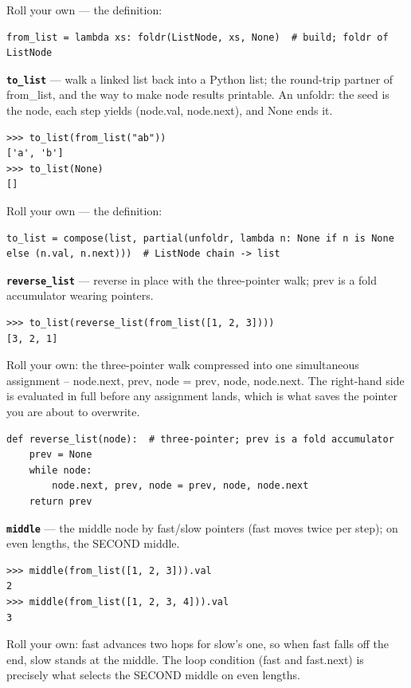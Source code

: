 \documentclass[10pt,letterpaper]{article}
\begin{document}
Roll your own --- the definition:

\begin{lstlisting}[style=ex]
from_list = lambda xs: foldr(ListNode, xs, None)  # build; foldr of ListNode
\end{lstlisting}
\textbf{\texttt{to\_list}} --- walk a linked list back into a Python list; the round-trip partner of from\_list, and the way to make node results printable. An unfoldr: the seed is the node, each step yields (node.val, node.next), and None ends it.
\begin{lstlisting}[style=ex]
>>> to_list(from_list("ab"))
['a', 'b']
>>> to_list(None)
[]
\end{lstlisting}

Roll your own --- the definition:

\begin{lstlisting}[style=ex]
to_list = compose(list, partial(unfoldr, lambda n: None if n is None else (n.val, n.next)))  # ListNode chain -> list
\end{lstlisting}
\textbf{\texttt{reverse\_list}} --- reverse in place with the three-pointer walk; prev is a fold accumulator wearing pointers.
\begin{lstlisting}[style=ex]
>>> to_list(reverse_list(from_list([1, 2, 3])))
[3, 2, 1]
\end{lstlisting}

Roll your own: the three-pointer walk compressed into one simultaneous assignment -- node.next, prev, node = prev, node, node.next. The right-hand side is evaluated in full before any assignment lands, which is what saves the pointer you are about to overwrite.

\begin{lstlisting}[style=ex]
def reverse_list(node):  # three-pointer; prev is a fold accumulator
    prev = None
    while node:
        node.next, prev, node = prev, node, node.next
    return prev
\end{lstlisting}
\textbf{\texttt{middle}} --- the middle node by fast/slow pointers (fast moves twice per step); on even lengths, the SECOND middle.
\begin{lstlisting}[style=ex]
>>> middle(from_list([1, 2, 3])).val
2
>>> middle(from_list([1, 2, 3, 4])).val
3
\end{lstlisting}

Roll your own: fast advances two hops for slow's one, so when fast falls off the end, slow stands at the middle. The loop condition (fast and fast.next) is precisely what selects the SECOND middle on even lengths.
\end{document}
